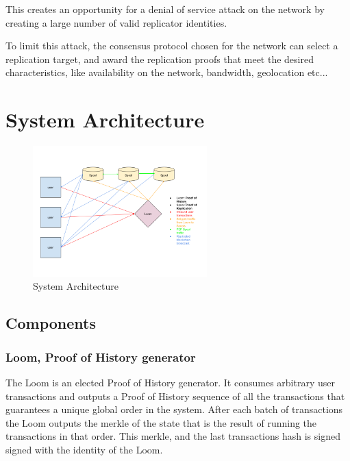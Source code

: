 \documentclass[12pt]{article}
\begin{document}
This creates an opportunity for a denial of service attack on the network by creating a large number of valid replicator identities.

To limit this attack, the consensus protocol chosen for the network can select a replication target, and award the replication proofs that meet the desired characteristics, like availability on the network, bandwidth, geolocation etc...
\section{System Architecture}\label{system_architecture}

\begin{figure}
  \begin{center}
    \centering
    \includegraphics[width=0.6\textwidth]{figures/fig_9.png}
    \caption[Fig 9]{System Architecture \label{fig_9}}
  \end{center}
  \end{figure}

\subsection{Components}

\subsubsection{Loom, Proof of History generator}
The Loom is an elected Proof of History generator. It consumes arbitrary user transactions and outputs a Proof of History sequence of all the transactions that guarantees a unique global order in the system. After each batch of transactions the Loom outputs the merkle of the state that is the result of running the transactions in that order. This merkle, and the last transactions hash is signed signed with the identity of the Loom.
\end{document}
